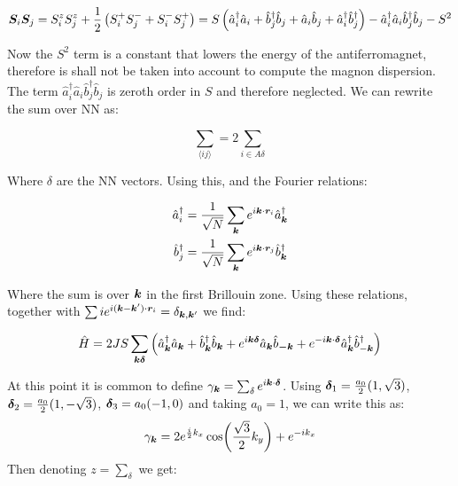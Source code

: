 \begin{align*}
\boldsymbol{S}_i\boldsymbol{S}_j = S_i^zS_j^z + \frac{1}{2}\left(S_i^+S_j^- + S_i^-S_j^+ \right) = S \left( \hat{a}^\dagger_i \hat{a}_i + \hat{b}^\dagger_j \hat{b}_j + \hat{a}_i\hat{b}_j + \hat{a}^\dagger_i\hat{b}^\dagger_j \right) - \hat{a}^\dagger_i \hat{a}_i\hat{b}^\dagger_j \hat{b}_j - S^2
\end{align*}

Now the $S^2$ term is a constant that lowers the energy of the antiferromagnet, therefore is shall not be taken into account to compute the magnon dispersion. The term $\hat{a}^\dagger_i \hat{a}_i\hat{b}^\dagger_j \hat{b}_j$ is zeroth order in $S$ and therefore neglected. We can rewrite the sum over NN as:

\begin{equation}
\sum_{\langle i j \rangle} = 2\sum_{i \in A \delta}
\end{equation}

Where $\delta$ are the NN vectors. Using this, and the Fourier relations:

\begin{align}
\hat{a}_i^\dagger &= \frac{1}{\sqrt{N}} \sum_{\boldsymbol{k}} e^{i \boldsymbol{k} \cdot \boldsymbol{r}_i} \hat{a}_{\boldsymbol{k}}^\dagger \\
\hat{b}_j^\dagger &= \frac{1}{\sqrt{N}} \sum_{\boldsymbol{k}} e^{i \boldsymbol{k} \cdot \boldsymbol{r}_j} \hat{b}_{\boldsymbol{k}}^\dagger
\end{align}

Where the sum is over $\boldsymbol{k}$ in the first Brillouin zone. Using these relations, together with $\sum{i} e^{i(\boldsymbol{k}-\boldsymbol{k}')\cdot\boldsymbol{r}_i} = \delta_{\boldsymbol{k}, \boldsymbol{k}'}$ we find:

\begin{equation}
\hat{H} = 2JS \sum_{\boldsymbol{k} \boldsymbol{\delta}} \left( \hat{a}^\dagger_{\boldsymbol{k}}\hat{a}_{\boldsymbol{k}} + \hat{b}^\dagger_{\boldsymbol{k}}\hat{b}_{\boldsymbol{k}} + e^{i\boldsymbol{k}\boldsymbol{\delta}}\hat{a}_{\boldsymbol{k}}\hat{b}_{\boldsymbol{-k}} + e^{-i \boldsymbol{k}\cdot\boldsymbol{\delta}}  \hat{a}^\dagger_{\boldsymbol{k}}\hat{b}^\dagger_{-\boldsymbol{k}} \right)
\end{equation}

At this point it is common to define $\gamma_{\boldsymbol{k}} = \sum_\delta e^{i \boldsymbol{k} \cdot \boldsymbol{\delta}}$. Using $\boldsymbol{\delta}_1=\frac{a_0}{2}(1,\sqrt{3})$, $\boldsymbol{\delta}_2=\frac{a_0}{2}(1,-\sqrt{3})$, $\boldsymbol{\delta}_3=a_0(-1,0)$ and taking $a_0=1$, we can write this as:
\begin{equation}
\gamma_{\boldsymbol{k}} = 2e^{\frac{i}{2}k_x}\cos(\frac{\sqrt{3}}{2}k_y)+e^{-ik_x}
\end{equation}
Then denoting $z = \sum_\delta$ we get:

